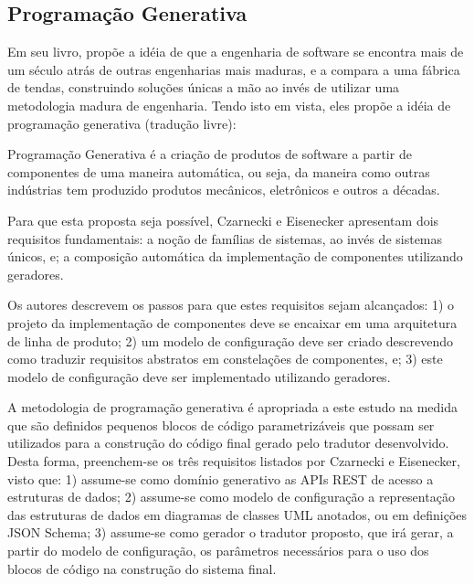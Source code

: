 \subsection{Programação Generativa}

Em seu livro,  propõe a idéia de que a engenharia de software se encontra mais de um século atrás de outras engenharias mais maduras, e a compara a uma fábrica de tendas, construindo soluções únicas a mão ao invés de utilizar uma metodologia madura de engenharia. Tendo isto em vista, eles propõe a idéia de programação generativa (tradução livre):

\begin{citacao}
Programação Generativa é a criação de produtos de software a partir de componentes de uma maneira automática, ou seja, da maneira como outras indústrias tem produzido produtos mecânicos, eletrônicos e outros a décadas.
\end{citacao}

Para que esta proposta seja possível, Czarnecki e Eisenecker apresentam dois requisitos fundamentais: a noção de famílias de sistemas, ao invés de sistemas únicos, e; a composição automática da implementação de componentes utilizando geradores.

Os autores descrevem os passos para que estes requisitos sejam alcançados: 1) o projeto da implementação de componentes deve se encaixar em uma arquitetura de linha de produto; 2) um modelo de configuração deve ser criado descrevendo como traduzir requisitos abstratos em constelações de componentes, e; 3) este modelo de configuração deve ser implementado utilizando geradores.

A metodologia de programação generativa é apropriada a este estudo na medida que são definidos pequenos blocos de código parametrizáveis que possam ser utilizados para a construção do código final gerado pelo tradutor desenvolvido. Desta forma, preenchem-se os três requisitos listados por Czarnecki e Eisenecker, visto que: 1) assume-se como domínio generativo as APIs REST de acesso a estruturas de dados; 2) assume-se como modelo de configuração a representação das estruturas de dados em diagramas de classes UML anotados, ou em definições JSON Schema; 3) assume-se como gerador o tradutor proposto, que irá gerar, a partir do modelo de configuração, os parâmetros necessários para o uso dos blocos de código na construção do sistema final.


